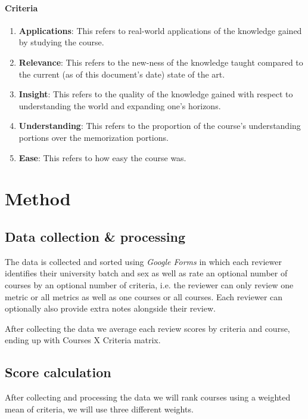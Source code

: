 \documentclass[12pt,a4paper]{article}
\begin{document}
\paragraph{Criteria}
\begin{enumerate}
    \item \textbf{Applications}: This refers to real-world applications of the knowledge gained by studying the course.
    \item \textbf{Relevance}: This refers to the new-ness of the knowledge taught compared to the current (as of this document's date) state of the art.
    \item \textbf{Insight}: This refers to the quality of the knowledge gained with respect to understanding the world and expanding one's horizons.
    \item \textbf{Understanding}: This refers to the proportion of the course's understanding portions over the memorization portions. 
    \item \textbf{Ease}: This refers to how easy the course was.
\end{enumerate}

\section{Method}
\subsection{Data collection \& processing}
The data is collected and sorted using \emph{Google Forms} in which each reviewer identifies their university batch and sex as well as rate an optional number of courses by an optional number of criteria, i.e. the reviewer can only review one metric or all metrics as well as one courses or all courses. Each reviewer can optionally also provide extra notes alongside their review.

After collecting the data we average each review scores by criteria and course, ending up with Courses X Criteria matrix.

\subsection{Score calculation}
After collecting and processing the data we will rank courses using a weighted mean of criteria, we will use three different weights.
\end{document}
